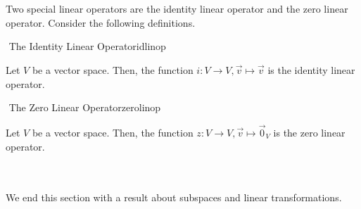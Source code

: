         \vphantom
        \\
        \\
        Two special linear operators are the identity linear operator and the zero linear operator. Consider the following definitions.
        \begin{definition}{\Stop\,\,The Identity Linear Operator}{idlinop}

            Let \(V\) be a vector space. Then, the function \(i:V\to V,\vec{v}\mapsto\vec{v}\) is the identity linear operator.
            
        \end{definition}
        \begin{definition}{\Stop\,\,The Zero Linear Operator}{zerolinop}

            Let \(V\) be a vector space. Then, the function \(z:V\to V,\vec{v}\mapsto\vec{0}_V\) is the zero linear operator.
            
        \end{definition}
        \pagebreak
        \vphantom
        \\
        \\
        We end this section with a result about subspaces and linear transformations.
